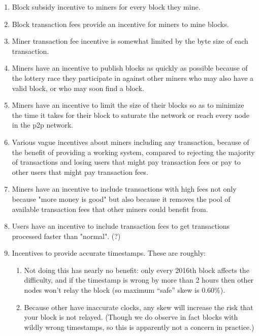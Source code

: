 \documentclass[letterpaper]{article}
\begin{document}
\begin{enumerate}
\item Block subsidy incentive to miners for every block they mine.

\item Block transaction fees provide an incentive for miners to mine blocks.

\item Miner transaction fee incentive is somewhat limited by the byte size of
each transaction.

\item Miners have an incentive to publish blocks as quickly as possible because
of the lottery race they participate in against other miners who may also have
a valid block, or who may soon find a block.

\item Miners have an incentive to limit the size of their blocks so as to
minimize the time it takes for their block to saturate the network or reach
every node in the p2p network.

\item Various vague incentives about miners including any transaction, because
of the benefit of providing a working system, compared to rejecting the
majority of transactions and losing users that might pay transaction fees or
pay to other users that might pay transaction fees.

\item Miners have an incentive to include transactions with high fees not only
because "more money is good" but also because it removes the pool of available
transaction fees that other miners could benefit from.

\item Users have an incentive to include transaction fees to get transactions
processed faster than "normal". (?)

\item Incentives to provide accurate timestamps. These are roughly:
\begin{enumerate}
\item Not doing this has nearly no benefit: only every 2016th block affects the
difficulty, and if the timestamp is wrong by more than 2 hours then other nodes
won't relay the block (so maximum ``safe'' skew is 0.60\%).
\item Because other have inaccurate clocks, any skew will increase the risk that
your block is not relayed. (Though we do observe in fact blocks with wildly wrong
timestamps, so this is apparently not a concern in practice.)
\end{enumerate}


\end{enumerate}
\end{document}
